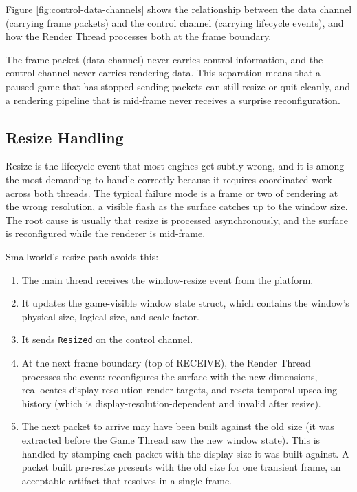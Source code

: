 \documentclass[
  11pt,
  letterpaper,
  DIV=11,
  numbers=noendperiod,
  twoside,
  open=right]{scrreprt}
\providecommand{\tightlist}{%
  \setlength{\itemsep}{0pt}\setlength{\parskip}{0pt}}
\begin{document}
Figure \ref{fig:control-data-channels} shows the relationship between
the data channel (carrying frame packets) and the control channel
(carrying lifecycle events), and how the Render Thread processes both at
the frame boundary.



The frame packet (data channel) never carries control information, and
the control channel never carries rendering data. This separation means
that a paused game that has stopped sending packets can still resize or
quit cleanly, and a rendering pipeline that is mid-frame never receives
a surprise reconfiguration.

\subsection{Resize Handling}\label{resize-handling}

Resize is the lifecycle event that most engines get subtly wrong, and it
is among the most demanding to handle correctly because it requires
coordinated work across both threads. The typical failure mode is a
frame or two of rendering at the wrong resolution, a visible flash as
the surface catches up to the window size. The root cause is usually
that resize is processed asynchronously, and the surface is reconfigured
while the renderer is mid-frame.

Smallworld's resize path avoids this:

\begin{enumerate}
\def\labelenumi{\arabic{enumi}.}
\tightlist
\item
  The main thread receives the window-resize event from the platform.
\item
  It updates the game-visible window state struct, which contains the
  window's physical size, logical size, and scale factor.
\item
  It sends \texttt{Resized} on the control channel.
\item
  At the next frame boundary (top of RECEIVE), the Render Thread
  processes the event: reconfigures the surface with the new dimensions,
  reallocates display-resolution render targets, and resets temporal
  upscaling history (which is display-resolution-dependent and invalid
  after resize).
\item
  The next packet to arrive may have been built against the old size (it
  was extracted before the Game Thread saw the new window state). This
  is handled by stamping each packet with the display size it was built
  against. A packet built pre-resize presents with the old size for one
  transient frame, an acceptable artifact that resolves in a single
  frame.
\end{enumerate}
\end{document}
